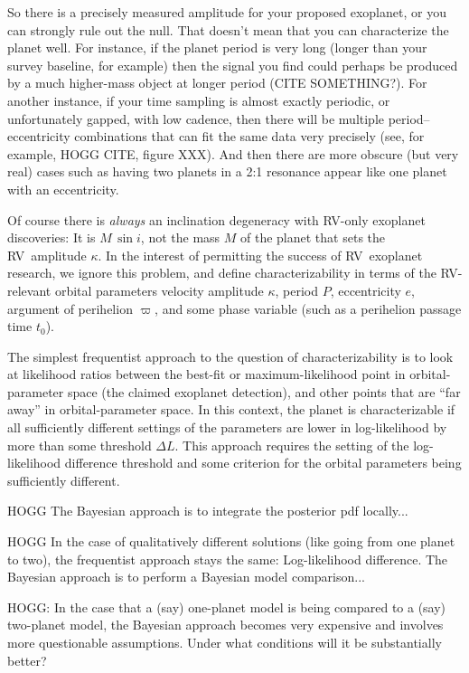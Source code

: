 \documentclass[modern]{aastex63}
\newcommand{\acronym}[1]{{\small{#1}}}
\newcommand{\rv}{\acronym{RV}}
\begin{document}
So there is a precisely measured amplitude for your proposed exoplanet,
or you can strongly rule out the null.
That doesn't mean that you can characterize the planet well.
For instance, if the planet period is very long (longer than your
survey baseline, for example) then the signal you find could perhaps
be produced by a much higher-mass object at longer period (CITE SOMETHING?).
For another instance, if your time sampling is almost exactly
periodic, or unfortunately gapped, with low cadence, then there will
be multiple period--eccentricity combinations that can fit the same
data very precisely (see, for example, HOGG CITE, figure XXX).
And then there are more obscure (but very real) cases such as having two
planets in a 2:1 resonance appear like one planet with an eccentricity.

Of course there is \emph{always} an inclination degeneracy with \rv-only
exoplanet discoveries: It is $M\,\sin i$, not the mass $M$ of the planet
that sets the \rv\ amplitude $\kappa$.
In the interest of permitting the success of \rv\ exoplanet research,
we ignore this problem, and define characterizability in terms of
the \rv-relevant orbital parameters velocity amplitude $\kappa$,
period $P$, eccentricity $e$, argument of perihelion $\varpi$, and
some phase variable (such as a perihelion passage time $t_0$).

The simplest frequentist approach to the question of
characterizability is to look at likelihood ratios between the
best-fit or maximum-likelihood point in orbital-parameter space (the
claimed exoplanet detection), and other points that are ``far away''
in orbital-parameter space.
In this context, the planet is characterizable if all sufficiently
different settings of the parameters are lower in log-likelihood by
more than some threshold $\Delta L$.
This approach requires the setting of the log-likelihood difference
threshold and some criterion for the orbital parameters being
sufficiently different.

HOGG The Bayesian approach is to integrate the posterior pdf locally...

HOGG In the case of qualitatively different solutions (like going from one
planet to two), the frequentist approach stays the same:
Log-likelihood difference. The Bayesian approach is to perform a
Bayesian model comparison...

HOGG: In the case that a (say) one-planet model is being compared to a
(say) two-planet model, the Bayesian approach becomes very expensive
and involves more questionable assumptions. Under what conditions will
it be substantially better?
\end{document}
